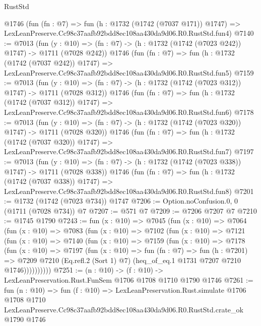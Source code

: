 \begin{lexlean}{RustStd}
\begin{coremodule}
    @1746
    (fun (fn : @7) =>
    fun (h : @1732 (@1742 (@7037 @171)) @1747) =>
    LexLeanPreserve.Cc98c37aafb92bdd8ec108aa430da9d06.R0.RustStd.fun4)
@7140 := @7013
    (fun (y : @10) => (fn : @7) -> (h : @1732 (@1742 (@7023 @242)) @1747) -> @1711 (@7028 @242))
    @1746
    (fun (fn : @7) =>
    fun (h : @1732 (@1742 (@7037 @242)) @1747) =>
    LexLeanPreserve.Cc98c37aafb92bdd8ec108aa430da9d06.R0.RustStd.fun5)
@7159 := @7013
    (fun (y : @10) => (fn : @7) -> (h : @1732 (@1742 (@7023 @312)) @1747) -> @1711 (@7028 @312))
    @1746
    (fun (fn : @7) =>
    fun (h : @1732 (@1742 (@7037 @312)) @1747) =>
    LexLeanPreserve.Cc98c37aafb92bdd8ec108aa430da9d06.R0.RustStd.fun6)
@7178 := @7013
    (fun (y : @10) => (fn : @7) -> (h : @1732 (@1742 (@7023 @320)) @1747) -> @1711 (@7028 @320))
    @1746
    (fun (fn : @7) =>
    fun (h : @1732 (@1742 (@7037 @320)) @1747) =>
    LexLeanPreserve.Cc98c37aafb92bdd8ec108aa430da9d06.R0.RustStd.fun7)
@7197 := @7013
    (fun (y : @10) => (fn : @7) -> (h : @1732 (@1742 (@7023 @338)) @1747) -> @1711 (@7028 @338))
    @1746
    (fun (fn : @7) =>
    fun (h : @1732 (@1742 (@7037 @338)) @1747) =>
    LexLeanPreserve.Cc98c37aafb92bdd8ec108aa430da9d06.R0.RustStd.fun8)
@7201 := @1732 (@1742 (@7023 @734)) @1747
@7206 := Option.noConfusion.{0, 0} (@1711 (@7028 @734)) @7
@7207 := @571 @7
@7209 := @7206 @7207 @7
@7210 := @1745 @1790
@7243 := fun (x : @10) =>
  @7045
    (fun (x : @10) =>
    @7064
      (fun (x : @10) =>
      @7083
        (fun (x : @10) =>
        @7102
          (fun (x : @10) =>
          @7121
            (fun (x : @10) =>
            @7140
              (fun (x : @10) =>
              @7159
                (fun (x : @10) =>
                @7178
                  (fun (x : @10) =>
                  @7197
                    (fun (x : @10) =>
                    fun (fn : @7) =>
                    fun (h : @7201) =>
                    @7209
                      @7210
                      (Eq.refl.{2} (Sort 1) @7)
                      (heq_of_eq.{1} @1731 @7207 @7210 @1746))))))))))
@7251 := (n : @10) -> (f : @10) -> LexLeanPreservation.Rust.FunSem @1706 @1708 @1710 @1790 @1746
@7261 := fun (n : @10) =>
  fun (f : @10) =>
  LexLeanPreservation.Rust.simulate
    @1706
    @1708
    @1710
    LexLeanPreserve.Cc98c37aafb92bdd8ec108aa430da9d06.R0.RustStd.crate_ok
    @1790
    @1746
\end{coremodule}
\end{lexlean}
